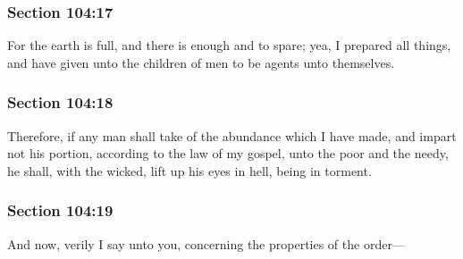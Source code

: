 	\subsubsection{Section 104:17} %
		\label{DC104-17}

		For the earth is full, and there is enough and to spare; yea, I prepared all things, and have given unto the children of men to be agents unto themselves.


	\subsubsection{Section 104:18} %
		\label{DC104-18}

		Therefore, if any man shall take of the abundance which I have made, and impart not his portion, according to the law of my gospel, unto the poor and the needy, he shall, with the wicked, lift up his eyes in hell, being in torment.


	\subsubsection{Section 104:19} %
		\label{DC104-19}

		And now, verily I say unto you, concerning the properties of the order---


